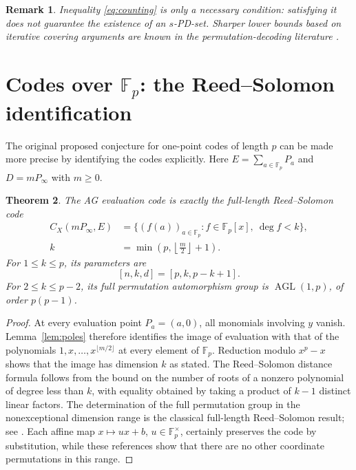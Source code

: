 \documentclass[12pt]{article}
\newtheorem{theorem}{Theorem}[section]
\newtheorem{remark}[theorem]{Remark}
\numberwithin{equation}{section}
\newcommand{\F}{\mathbb{F}}
\newcommand{\AGL}{\operatorname{AGL}}
\begin{document}
\begin{remark}
Inequality \eqref{eq:counting} is only a \emph{necessary}
condition: satisfying it does not guarantee the existence
of an $s$-PD-set.  Sharper lower bounds based on iterative
covering arguments are known in the permutation-decoding
literature \cite{HP}.
\end{remark}

\section{Codes over $\F_p$: the Reed--Solomon identification}
\label{sec:RS}
The original proposed conjecture for one-point codes of
length $p$ can be made more precise by identifying the codes
explicitly.  Here $E=\sum_{a\in\F_p}P_a$ and
$D=mP_\infty$ with $m\geq0$.

\begin{theorem}\label{thm:RS}
The AG evaluation code is exactly the full-length
Reed--Solomon code
\begin{equation}\label{eq:RS}
\begin{aligned}
C_X(mP_\infty,E)
 &=\{(f(a))_{a\in\F_p}: f\in\F_p[x],\ \deg f<k\},\\
k&=\min\left(p,\left\lfloor\frac m2\right\rfloor+1\right).
\end{aligned}
\end{equation}
For $1\leq k\leq p$, its parameters are
\[
[n,k,d]=[p,k,p-k+1].
\]
For $2\leq k\leq p-2$, its full permutation automorphism
group is $\AGL(1,p)$, of order $p(p-1)$.
\end{theorem}
\begin{proof}
At every evaluation point $P_a=(a,0)$, all monomials involving
$y$ vanish.  Lemma~\ref{lem:poles} therefore identifies the
image of evaluation with that of the polynomials
$1,x,\ldots,x^{\lfloor m/2\rfloor}$ at every element of
$\F_p$.  Reduction modulo $x^p-x$ shows that the image
has dimension $k$ as stated.  The Reed--Solomon distance
formula follows from the bound on the number of roots of a
nonzero polynomial of degree less than $k$, with equality
obtained by taking a product of $k-1$ distinct linear factors.
The determination of the full permutation group in the
nonexceptional dimension range is the classical full-length
Reed--Solomon result; see \cite{KW,CLLS}.  Each affine map
$x\mapsto ux+b$, $u\in\F_p^\times$, certainly preserves
the code by substitution, while these references show
that there are no other coordinate permutations in this range.
\end{proof}
\end{document}
